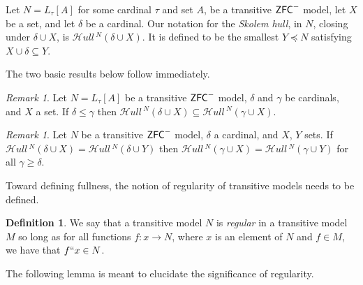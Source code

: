 \documentclass{amsart}
\theoremstyle{definition}
\newtheorem{definition}[theorem]{Definition}
\theoremstyle{remark}
\newtheorem{remark}[theorem]{Remark}
\newcommand{\ZFC}{\textup{\ensuremath{\textsf{ZFC}}}}
\newcommand{\To}{\longrightarrow}
\newcommand{\SH}{\mathcal{H}\textit{ull} \,}
\newcommand{\Sk}[3]{\SH^{#1}( {#2} \cup {#3} ) }
\begin{document}
Let $N = L_\tau[A]$ for some cardinal $\tau$ and set $A$, be a transitive $\ZFC^-$ model, let $X$ be a set, and let $\delta$ be a cardinal. Our notation for the \emph{Skolem hull}, in $N$, closing under $\delta \cup X$, is $\Sk{N}{\delta}{X}$. It is defined to be the smallest $Y \preccurlyeq N$ satisfying $X \cup \delta \subseteq Y$.
	
The two basic results below follow immediately.

\begin{remark} \label{remark:subsethull}
Let $N=L_\tau[A]$ be a transitive $\ZFC^-$ model, $\delta$ and $\gamma$ be cardinals, and $X$ a set. If $\delta \leq \gamma$ then $\Sk{N}{\delta}{X} \subseteq \Sk{N}{\gamma}{X}$. 
\end{remark}

\begin{remark} \label{remark:hullequality} Let $N$ be a transitive $\ZFC^-$ model, $\delta$ a cardinal, and $X$, $Y$ sets. If $\Sk{N}{\delta}{X} = \Sk{N}{\delta}{Y}$ then $\Sk{N}{\gamma}{X} = \Sk{N}{\gamma}{Y}$ for all $\gamma \geq \delta$. \end{remark}

Toward defining fullness, the notion of regularity of transitive models needs to be defined.

\begin{definition} We say that a transitive model $N$ is \emph{regular} in a transitive model $M$ so long as for all functions $f: x \To N$, where $x$ is an element of $N$ and $f \in M$, we have that $f``x \in N$. \end{definition}
The following lemma is meant to elucidate the significance of regularity.
\end{document}
